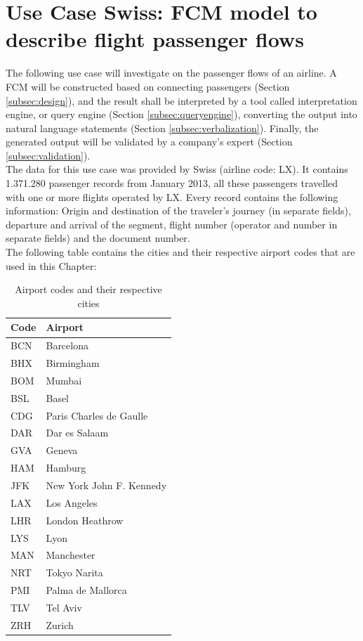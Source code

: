 \documentclass[conference]{IEEEtran}
\begin{document}
\section{Use Case Swiss: FCM model to describe flight passenger flows}
\label{sec:usecase}
The following use case will investigate on the passenger flows of an airline. A FCM will be constructed based on connecting passengers (Section \ref{subsec:design}), and the result shall be interpreted by a tool called interpretation engine, or query engine (Section \ref{subsec:queryengine}), converting the output into natural language statements (Section \ref{subsec:verbalization}). Finally, the generated output will be validated by a company's expert (Section \ref{subsec:validation}).\\
The data for this use case was provided by Swiss (airline code: LX). It contains 1.371.280 passenger records from January 2013, all these passengers travelled with one or more flights operated by LX. Every record contains the following information: Origin and destination of the traveler's journey (in separate fields), departure and arrival of the segment, flight number (operator and number in separate fields) and the document number.\\
The following table contains the cities and their respective airport codes that are used in this Chapter:
\begin{center}
\begin{table}[h]
\begin{tabular}{l|l}
\textbf{Code} & \textbf{Airport}\\ \hline
BCN & Barcelona\\ \hline
BHX & Birmingham\\ \hline
BOM & Mumbai\\ \hline
BSL & Basel\\ \hline
CDG & Paris Charles de Gaulle\\ \hline
DAR & Dar es Salaam\\ \hline
GVA & Geneva\\ \hline
HAM & Hamburg\\ \hline
JFK & New York John F. Kennedy\\ \hline
LAX & Los Angeles\\ \hline
LHR & London Heathrow\\ \hline
LYS & Lyon\\ \hline
MAN & Manchester\\ \hline
NRT & Tokyo Narita\\ \hline
PMI & Palma de Mallorca\\ \hline
TLV & Tel Aviv\\ \hline
ZRH & Zurich\\
\end{tabular}
\caption{Airport codes and their respective cities}
\label{tab:airportcodes}
\end{table}
\end{center}
\end{document}
